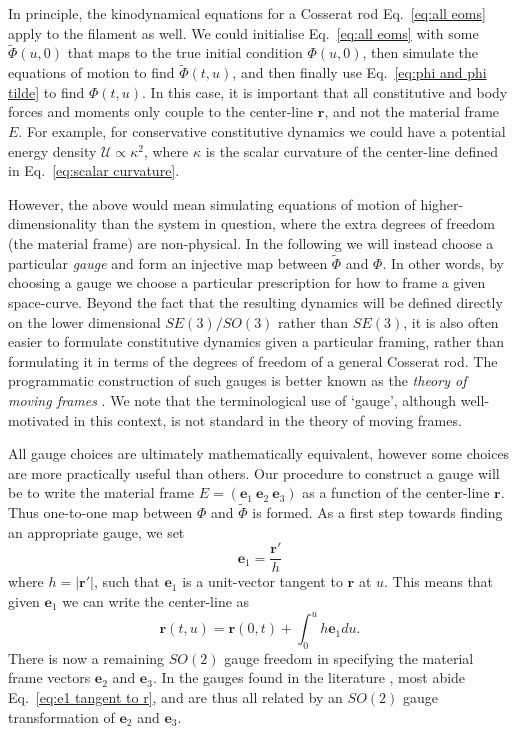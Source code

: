 In principle, the kinodynamical equations for a Cosserat rod Eq.~\ref{eq:all eoms} apply to the filament as well. We could initialise Eq.~\ref{eq:all eoms} with some $\tilde{\Phi}(u, 0)$ that maps to the true initial condition $\Phi(u, 0)$, then simulate the equations of motion to find $\tilde{\Phi}(t,u)$, and then finally use Eq.~\ref{eq:phi and phi tilde} to find $\Phi(t, u)$. In this case, it is important that all constitutive and body forces and moments only couple to the center-line $\mathbf{r}$, and not the material frame $E$. For example, for conservative constitutive dynamics we could have a potential energy density $\mathcal{U} \propto \kappa^2$, where $\kappa$ is the scalar curvature of the center-line defined in Eq.~\ref{eq:scalar curvature}.

However, the above would mean simulating equations of motion of higher-dimensionality than the system in question, where the extra degrees of freedom (the material frame) are non-physical. In the following we will instead choose a particular \textit{gauge} and form an injective map between $\tilde{\Phi}$ and $\Phi$. In other words, by choosing a gauge we choose a particular prescription for how to frame a given space-curve. Beyond the fact that the resulting dynamics will be defined directly on the lower dimensional $SE(3)/SO(3)$ rather than $SE(3)$, it is also often easier to formulate constitutive dynamics given a particular framing, rather than formulating it in terms of the degrees of freedom of a general Cosserat rod. The programmatic construction of such gauges is better known as the \textit{theory of moving frames} \citep{cartanTheorieGroupesFinis1938, levyReviewElieCartan1935}. We note that the terminological use of `gauge', although well-motivated in this context, is not standard in the theory of moving frames.

All gauge choices are ultimately mathematically equivalent, however some choices are more practically useful than others. Our procedure to construct a gauge will be to write the material frame $E = (\mathbf{e}_1\ \mathbf{e}_2\ \mathbf{e}_3)$ as a function of the center-line $\mathbf{r}$. Thus one-to-one map between $\Phi$ and $\tilde{\Phi}$ is formed. As a first step towards finding an appropriate gauge, we set
\begin{equation} \label{eq:e1 tangent to r}
\mathbf{e}_1 = \frac{\mathbf{r}'}{h}
\end{equation}
where $h = |\mathbf{r}'|$, such that $\mathbf{e}_1$ is a unit-vector tangent to $\mathbf{r}$ at $u$. This means that given $\mathbf{e}_1$ we can write the center-line as
\begin{equation} \label{eq:r from e1} 
\mathbf{r}(t, u) = \mathbf{r}(0, t) + \int_0^u h \mathbf{e}_1 du.
\end{equation} 
There is now a remaining $SO(2)$ gauge freedom in specifying the material frame vectors $\mathbf{e}_2$ and $\mathbf{e}_3$. In the gauges found in the literature \citep{bishopThereMoreOne1975, mansfieldUseRotationMinimizing2019, clellandFrenetCartanMethod2017, carrollImprovingFrenetFrame2013, seligCharacterisationFrenetSerret2013}, most abide Eq.~\ref{eq:e1 tangent to r}, and are thus all related by an $SO(2)$ gauge transformation of $\mathbf{e}_2$ and $\mathbf{e}_3$.

